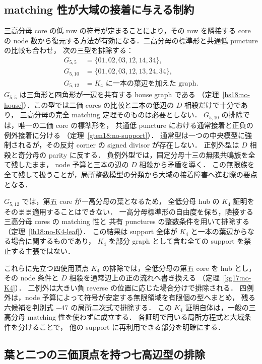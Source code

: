 \subsection{matching 性が大域の接着に与える制約}

三高分母 core の低 row の符号が定まることにより，その row を隣接する core の
node 数から復元する方法が有効になる．二高分母の標準形と共通低 puncture の比較も合わせ，
次の三型を排除する：
\[
 \begin{split}
 G_{5,5}&=\{01,02,03,12,14,34\},\\
 G_{5,10}&=\{01,02,03,12,13,24,34\},\\
 G_{5,12}&=K_4\text{ に一本の葉辺を加えた graph}.
 \end{split}
\]
$G_{5,5}$ は三角形と四角形が一辺を共有する house graph である
（定理~\ref{hs18:no-house}）．この型では二価 cores の比較と二本の低辺の $D$ 相殺だけで十分であり，
三高分母の完全 matching 定理そのものは必要としない．
$G_{5,10}$ の排除では，唯一の二価 core の標準形を，
共通低 puncture における通常接着と正負の例外接着に分ける
（定理~\ref{gten18:no-support}）．
通常型は一つの中央模型に強制されるが，その反対 corner の signed divisor が存在しない．
正例外型は $D$ 相殺と奇分母の parity に反する．
負例外型では，固定分母十三の無限共鳴族を全て残したまま，
node 予算と三本の辺の $D$ 相殺から矛盾を導く．
この無限族を全て残して扱うことが，局所整数模型の分類から大域の接着障害へ進む際の要点となる．

$G_{5,12}$ では，第五 core が一高分母の葉となるため，
全低分母 hub の $K_4$ 証明をそのまま適用することはできない．
一高分母標準形の自由度を保ち，隣接する三高分母 cores の matching 性と
共有 punctures の整数条件を用いて排除する
（定理~\ref{lh18:no-K4-leaf}）．
この結果は support 全体が $K_4$ と一本の葉辺からなる場合に関するものであり，
$K_4$ を部分 graph として含む全ての support を禁止する主張ではない．

これらに先立つ四使用頂点 $K_4$ の排除では，全低分母の第五 core を hub とし，
その node 条件と $D$ 相殺を通常辺上の正の流れへ書き換える
（定理~\ref{kg17:no-K4}）．
二例外は大きい負 reverse の位置に応じた場合分けで排除される．
四例外は，node 予算によって符号が安定する無限領域を有限個の型へまとめ，
残る六候補を判別式 $-47$ の局所二次式で排除する．
この $K_4$ 証明自体は，一般の三高分母 matching 性を使わずに成立する．
各証明で用いる局所方程式と大域条件を分けることで，
他の support に再利用できる部分を明確にする．

\subsection{葉と二つの三価頂点を持つ七高辺型の排除}


